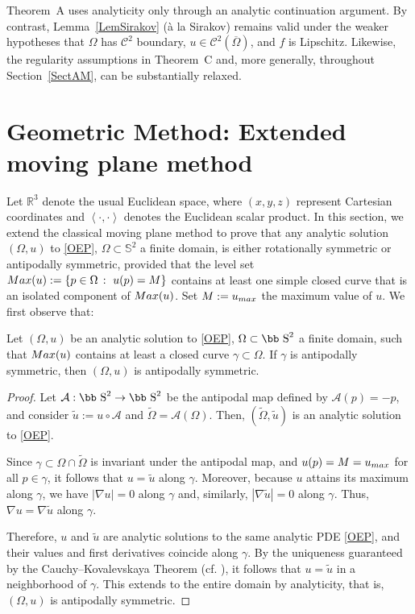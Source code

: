 \documentclass[11pt]{article}
\def\s{\hbox{\bb S}}
\newcommand{\set}[1]{\left\{#1\right\}}
\newcommand{\pscalar}[2]{\left\langle #1, #2 \right\rangle}
\numberwithin{equation} {section}
\begin{document}
Theorem~A uses analyticity only through an analytic continuation argument. By contrast, Lemma~\ref{LemSirakov} (à la Sirakov) remains valid under the weaker hypotheses that $\Omega$ has $\mathcal{C}^2$ boundary, $u\in\mathcal{C}^2(\overline{\Omega})$, and $f$ is Lipschitz. Likewise, the regularity assumptions in Theorem~C and, more generally, throughout Section~\ref{SectAM}, can be substantially relaxed.

\section{Geometric Method: Extended moving plane method}\label{SectGM}

Let $\mathbb{R}^3$ denote the usual Euclidean space, where $(x,y,z)$ represent Cartesian coordinates and $\pscalar{\cdot}{\cdot}$ denotes the Euclidean scalar product. In this section, we extend the classical moving plane method to prove that any analytic solution \((\Omega, u)\) to \eqref{OEP}, \(\Omega \subset \mathbb{S}^2\) a finite domain, is either rotationally symmetric or antipodally symmetric, provided that the level set \(\textup{Max}(u) := \set{p \in \Omega \, : \, \, u (p) = M}\) contains at least one simple closed curve that is an isolated component of $\textup{Max}(u)$. Set \(M:= u_{\textup{max}}\) the maximum value of \(u\). We first observe that:

\begin{lemma}\label{lemmaTheoremA1}
Let $(\Omega,u)$ be an analytic solution to \eqref{OEP}, $\Omega \subset \s^2$ a finite domain, such that $\textup{Max}(u)$ contains at least a closed curve $\gamma \subset \Omega$. If $\gamma$ is antipodally symmetric, then $(\Omega,u)$ is antipodally symmetric.
\end{lemma}
\begin{proof}
Let $\mathcal A : \s ^2 \to \s ^2$ be the antipodal map defined by $\mathcal A (p) =-p$, and consider $\tilde u := u \circ \mathcal A$ and $\tilde \Omega = \mathcal A (\Omega)$. Then, $( \tilde \Omega , \tilde u)$ is an analytic solution to \eqref{OEP}. 
	
Since $\gamma \subset \Omega \cap \tilde \Omega $ is invariant under the antipodal map, and $u (p) = M = u_{\textup{max}}$ for all $p \in \gamma$, it follows that $u=\tilde u$ along $\gamma$. Moreover, because $u$ attains its maximum along $\gamma$, we have $|\nabla u | =0$ along $\gamma$ and, similarly, $|\nabla \tilde u | =0$ along $\gamma$. Thus, $\nabla u = \nabla \tilde u$ along $\gamma$. 
	
	Therefore, $u$ and $\tilde u$ are analytic solutions to the same analytic PDE \eqref{OEP}, and their values and first derivatives coincide along $\gamma$. By the uniqueness guaranteed by the Cauchy–Kovalevskaya Theorem (cf. \cite{Kr}), it follows that $u = \tilde u$ in a neighborhood of $\gamma$. This extends to the entire domain by analyticity, that is, $(\Omega ,u) $ is antipodally symmetric.
\end{proof}
\end{document}
